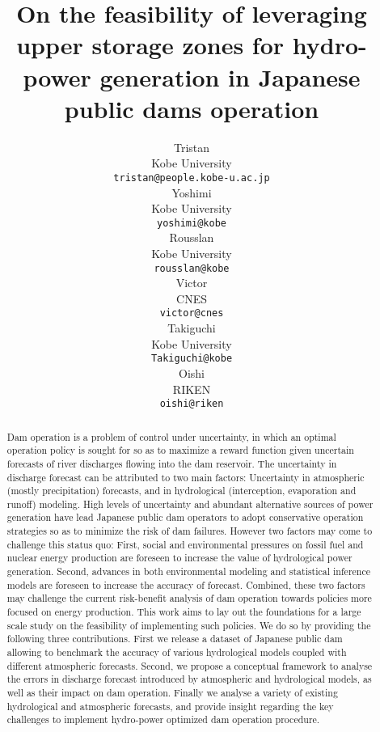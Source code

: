 \documentclass{article}
\title{
	On the feasibility of leveraging upper storage zones
  for hydro-power generation in Japanese public dams operation
}
\author{ Tristan \\
	Kobe University\\
	\texttt{tristan@people.kobe-u.ac.jp} \\
	\And
	Yoshimi \\
	Kobe University\\
	\texttt{yoshimi@kobe} \\
	\And
	Rousslan \\
	Kobe University\\
	\texttt{rousslan@kobe} \\
	\And
	Victor \\
	CNES\\
	\texttt{victor@cnes} \\
	\And
	Takiguchi \\
	Kobe University\\
	\texttt{Takiguchi@kobe} \\
	\And
	Oishi \\
	RIKEN\\
	\texttt{oishi@riken} \\
}
\date{}
\begin{document}
\maketitle

\begin{abstract}

Dam operation is a problem of control under uncertainty,
in which an optimal operation policy is sought for so as to maximize
a reward function given uncertain forecasts of river discharges flowing into the dam reservoir.
The uncertainty in discharge forecast can be attributed to two main factors:
Uncertainty in atmospheric (mostly precipitation) forecasts,
and in hydrological (interception, evaporation and runoff) modeling.
High levels of uncertainty and abundant alternative sources of power generation
have lead Japanese public dam operators to adopt conservative operation strategies
so as to minimize the risk of dam failures.
However two factors may come to challenge this status quo:
First, social and environmental pressures on fossil fuel and nuclear energy production
are foreseen to increase the value of hydrological power generation.
Second, advances in both environmental modeling and statistical inference models
are foreseen to increase the accuracy of forecast.
Combined, these two factors may challenge the current risk-benefit analysis
of dam operation towards policies more focused on energy production.
This work aims to lay out the foundations for a large scale study
on the feasibility of implementing such policies.
We do so by providing the following three contributions.
First we release a dataset of Japanese public dam allowing to benchmark the accuracy of
various hydrological models coupled with different atmospheric forecasts.
Second, we propose a conceptual framework to analyse the errors in discharge forecast
introduced by atmospheric and hydrological models, as well as their impact on dam operation.
Finally we analyse a variety of existing hydrological and atmospheric forecasts,
and provide insight regarding the key challenges to implement hydro-power optimized
dam operation procedure.

\end{abstract}
\end{document}
